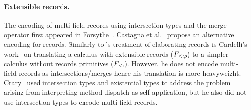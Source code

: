 \paragraph{Extensible records.}%
The encoding of multi-field records using intersection types and the merge operator first appeared in 
Forsythe~\cite{reynolds1997design}. Castagna et
al.~\cite{castagna1995calculus} propose an alternative encoding for records. 
Similarly to \name's treatment of elaborating records is
Cardelli's work~\cite{cardelli1992extensible} on translating a calculus
with extensible records ($ F_{<: \rho}$) to a simpler calculus without
records primitives ($ F_{<:} $). 
However, he does not encode multi-field records as intersections/merges hence his translation is more
heavyweight. 
Crary~\cite{crary1998simple} used intersection types and
existential types to address the problem arising from interpreting method
dispatch as self-application, 
but he also did not use intersection types to encode multi-field records.

